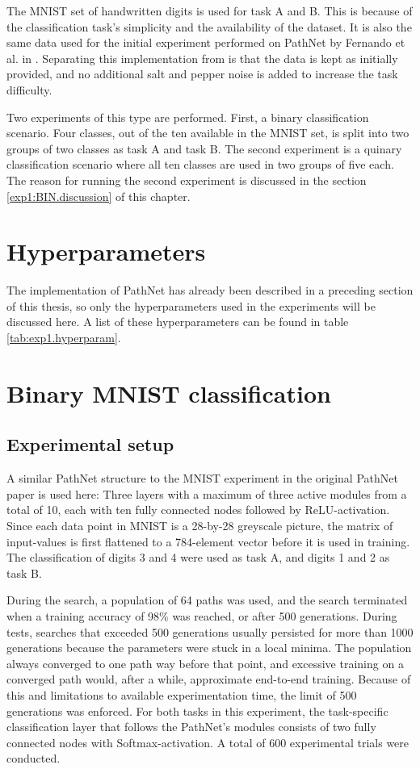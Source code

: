 The MNIST set of handwritten digits is used for task A and B. This is because of the classification task's simplicity and the availability of the dataset. It is also the same data used for the initial experiment performed on PathNet by Fernando et al. in \cite{pathnet}. Separating this implementation from \cite{pathnet} is that the data is kept as initially provided, and no additional salt and pepper noise is added to increase the task difficulty. 

Two experiments of this type are performed. First, a binary classification scenario. Four classes, out of the ten available in the MNIST set, is split into two groups of two classes as task A and task B. The second experiment is a quinary classification scenario where all ten classes are used in two groups of five each. The reason for running the second experiment is discussed in the section \ref{exp1:BIN.discussion} of this chapter. 

\section{Hyperparameters}
\label{exp1:implementation}
The implementation of PathNet has already been described in a preceding section of this thesis, so only the hyperparameters used in the experiments will be discussed here. A list of these hyperparameters can be found in table \ref{tab:exp1.hyperparam}.



\section{Binary MNIST classification}

\subsection{Experimental setup}
A similar PathNet structure to the MNIST experiment in the original PathNet paper is used here: Three layers with a maximum of three active modules from a total of 10, each with ten fully connected nodes followed by ReLU-activation. Since each data point in MNIST is a 28-by-28 greyscale picture, the matrix of input-values is first flattened to a 784-element vector before it is used in training. The classification of digits 3 and 4 were used as task A, and digits 1 and 2 as task B. 

During the search, a population of 64 paths was used, and the search terminated when a training accuracy of 98\% was reached, or after 500 generations. During tests, searches that exceeded 500 generations usually persisted for more than 1000 generations because the parameters were stuck in a local minima. The population always converged to one path way before that point, and excessive training on a converged path would, after a while, approximate end-to-end training. Because of this and limitations to available experimentation time, the limit of 500 generations was enforced. For both tasks in this experiment, the task-specific classification layer that follows the PathNet's modules consists of two fully connected nodes with Softmax-activation. A total of 600 experimental trials were conducted.  

